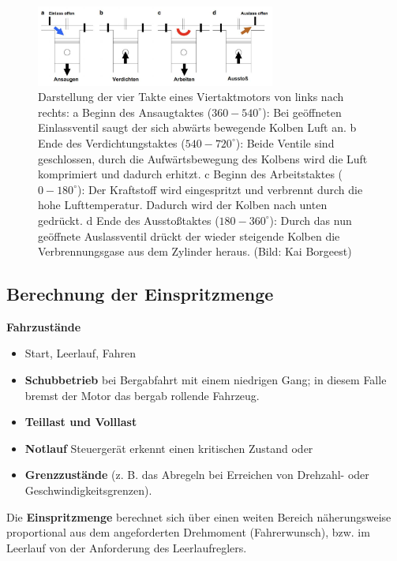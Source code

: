 \begin{figure}[!ht]%
\centering
\includegraphics[width=0.7\textwidth]{images/EDC/EDC-2.pdf}
\caption{Darstellung der vier Takte eines Viertaktmotors von links nach
rechts: a Beginn des Ansaugtaktes ($360-540^\circ$): Bei geöffneten
Einlassventil saugt der sich abwärts bewegende Kolben Luft an. b Ende
des Verdichtungstaktes ($540-720^\circ$): Beide Ventile sind
geschlossen, durch die Aufwärtsbewegung des Kolbens wird die Luft
komprimiert und dadurch erhitzt. c Beginn des Arbeitstaktes
($0-180^\circ$): Der Kraftstoff wird eingespritzt und verbrennt durch
die hohe Lufttemperatur. Dadurch wird der Kolben nach unten gedrückt. d
Ende des Ausstoßtaktes ($180-360^\circ$): Durch das nun geöffnete
Auslassventil drückt der wieder steigende Kolben die Verbrennungsgase
aus dem Zylinder heraus. (Bild: Kai Borgeest)}
\end{figure}

\newpage

\subsection{Berechnung der
Einspritzmenge}\label{berechnung-der-einspritzmenge}

\textbf{Fahrzustände}

\begin{itemize}
\item
  Start, Leerlauf, Fahren
\item
  \textbf{Schubbetrieb} bei Bergabfahrt mit einem niedrigen Gang; in
  diesem Falle bremst der Motor das bergab rollende Fahrzeug.
\item
  \textbf{Teillast und Volllast}
\item
  \textbf{Notlauf} Steuergerät erkennt einen kritischen Zustand oder
\item
  \textbf{Grenzzustände} (z. B. das Abregeln bei Erreichen von Drehzahl-
  oder Geschwindigkeitsgrenzen).
\end{itemize}

Die \textbf{Einspritzmenge} berechnet sich über einen weiten Bereich
näherungsweise proportional aus dem angeforderten Drehmoment
(Fahrerwunsch), bzw. im Leerlauf von der Anforderung des
Leerlaufreglers.

